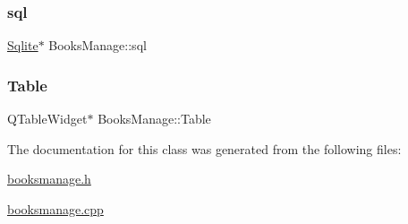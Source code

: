 \subsubsection{\texorpdfstring{sql}{sql}}
{\footnotesize\ttfamily \mbox{\hyperlink{class_sqlite}{Sqlite}}$\ast$ Books\+Manage\+::sql\hspace{0.3cm}{\ttfamily [private]}}

\mbox{\label{class_books_manage_a0c82c7e6c92bc699d5f59af1e8a81d7a}} 
\subsubsection{\texorpdfstring{Table}{Table}}
{\footnotesize\ttfamily Q\+Table\+Widget$\ast$ Books\+Manage\+::\+Table\hspace{0.3cm}{\ttfamily [private]}}



The documentation for this class was generated from the following files\+:\begin{DoxyCompactItemize}
\item 
\mbox{\hyperlink{booksmanage_8h}{booksmanage.\+h}}\item 
\mbox{\hyperlink{booksmanage_8cpp}{booksmanage.\+cpp}}\end{DoxyCompactItemize}
